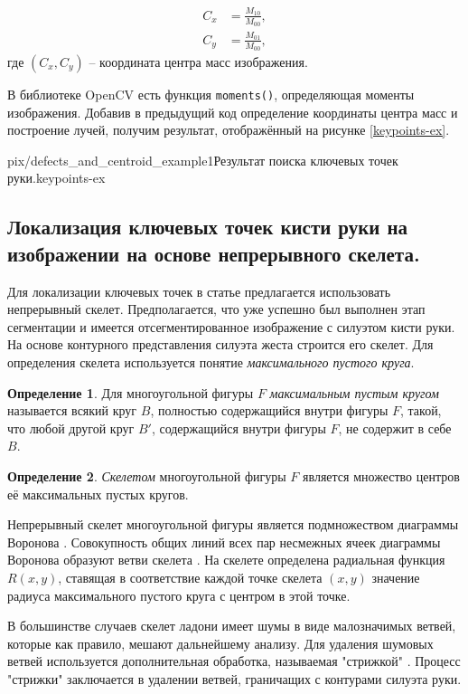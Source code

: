 \begin{equation}
	\begin{aligned}
		C_x&=\frac{M_{10}}{M_{00}}, \\
		C_y&=\frac{M_{01}}{M_{00}},
	\end{aligned}
	\label{centroid-equat}
\end{equation}
где $(C_x, C_y)$ -- координата центра масс изображения.

В библиотеке OpenCV есть функция {\tt moments()}, определяющая
моменты изображения. Добавив в предыдущий код определение
координаты центра масс и построение лучей, получим результат, 
отображённый на рисунке \ref{keypoints-ex}.

{pix/defects_and_centroid_example1}{Результат поиска ключевых точек
руки.}{keypoints-ex}

\subsection{Локализация ключевых точек кисти руки на изображении
на основе непрерывного скелета.}

Для локализации ключевых точек в статье \cite{nosov} предлагается
использовать непрерывный скелет. Предполагается, что уже успешно 
был выполнен этап сегментации и имеется отсегментированное
изображение с силуэтом кисти руки. На основе контурного представления
силуэта жеста строится его скелет. Для определения скелета
используется понятие {\it максимального пустого круга}.

{\bf Определение 1}. Для многоугольной фигуры $F$ {\it максимальным
пустым кругом} называется всякий круг $B$, полностью 
содержащийся внутри фигуры $F$, такой, что любой другой круг $B'$,
содержащийся внутри фигуры $F$, не содержит в себе $B$.

{\bf Определение 2}. {\it Скелетом} многоугольной фигуры $F$
является множество центров её максимальных пустых кругов.

Непрерывный скелет многоугольной фигуры является подмножеством
диаграммы Воронова \cite{mesteckij}. Совокупность общих линий всех пар 
несмежных ячеек диаграммы Воронова образуют ветви скелета 
\cite{mesteckij}. На скелете определена радиальная функция $R(x,y)$,
ставящая в соответствие каждой точке скелета $(x,y)$ значение
радиуса максимального пустого круга с центром в этой точке.

В большинстве случаев скелет ладони имеет шумы в виде
малозначимых ветвей, которые как правило, мешают дальнейшему анализу.
Для удаления шумовых ветвей используется дополнительная обработка,
называемая "стрижкой" \cite{mesteckij}. Процесс "стрижки" заключается
в удалении ветвей, граничащих с контурами силуэта руки.

